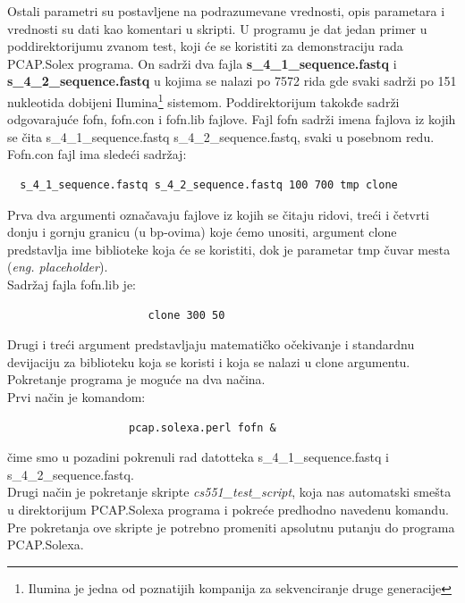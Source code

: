 \documentclass[a4paper]{article}
\begin{document}
{Ostali parametri su postavljene na podrazumevane vrednosti, opis parametara i vrednosti su dati kao komentari u skripti. U programu je dat jedan primer u poddirektorijumu zvanom test, koji će se koristiti za demonstraciju rada PCAP.Solex programa. On sadrži dva fajla \textbf{s\_4\_1\_sequence.fastq} i \textbf{s\_4\_2\_sequence.fastq} u kojima se nalazi po 7572 rida gde svaki sadrži po 151 nukleotida dobijeni Ilumina\footnote{Ilumina je jedna od poznatijih kompanija za sekvenciranje druge generacije} sistemom. Poddirektorijum takokđe sadrži odgovarajuće fofn, fofn.con i fofn.lib fajlove. Fajl fofn sadrži imena fajlova iz kojih se čita s\_4\_1\_se\-que\-nce.fastq s\_4\_2\_sequence.fastq, svaki u posebnom redu.\\ Fofn.con fajl ima sledeći sadržaj: 
\begin{verbatim}
  s_4_1_sequence.fastq s_4_2_sequence.fastq 100 700 tmp clone
\end{verbatim}
Prva dva argumenti označavaju fajlove iz kojih se čitaju ridovi, treći i četvrti donju i gornju granicu (u bp-ovima) koje ćemo unositi, argument clone predstavlja ime biblioteke koja će se koristiti, dok je parametar tmp čuvar mesta (\textit{eng. placeholder}).\\ Sadržaj fajla fofn.lib je:
\begin{verbatim}
                      clone 300 50
\end{verbatim}
Drugi i treći argument predstavljaju matematičko očekivanje i standardnu devijaciju za biblioteku koja se koristi i koja se nalazi u clone argumentu. Pokretanje programa je moguće na dva načina. 
\\Prvi način je komandom:
\begin{verbatim}
                   pcap.solexa.perl fofn &
\end{verbatim}
čime smo u pozadini pokrenuli rad datotteka s\_4\_1\_sequence.fastq i s\_4\_2\_sequence.fastq. \\ Drugi način je pokretanje skripte \textit{cs551\_test\_script}, koja nas automatski smešta u direktorijum PCAP.Solexa programa i pokreće predhodno navedenu komandu. Pre pokretanja ove skripte je potrebno promeniti apsolutnu putanju do programa PCAP.Solexa.
}
\end{document}
